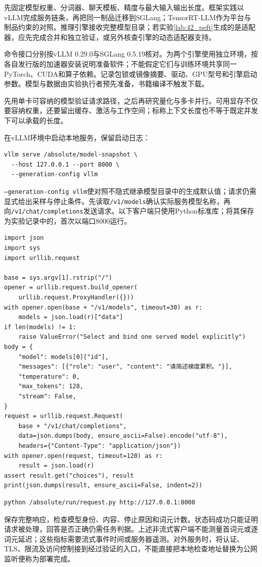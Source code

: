 先固定模型权重、分词器、聊天模板、精度与最大输入输出长度。框架实践以vLLM完成服务链条，再把同一制品迁移到SGLang；TensorRT-LLM作为平台与制品约束的对照\cite{vllm2026framework,sglang2026framework,nvidia2026tensorrtframework}。推理引擎接收完整模型目录；若实验\ref{lab:42_peft}生成的是适配器，应先完成合并和独立验证，或另外核查引擎的动态适配器支持。

命令接口分别按vLLM 0.29.0与SGLang 0.5.19核对。为两个引擎使用独立环境，按各自发行版的加速器安装说明准备软件；不能假定它们与训练环境共享同一PyTorch、CUDA和算子依赖。记录包锁或镜像摘要、驱动、GPU型号和引擎启动参数。模型与数据由实验执行者预先准备，书籍编译不触发下载。

先用单卡可容纳的模型验证请求路径，之后再研究量化与多卡并行。可用显存不仅要容纳权重，还要留出缓存、激活与工作空间；标称上下文长度也不等于既定并发下可以承载的长度。

在vLLM环境中启动本地服务，保留启动日志：
\begin{verbatim}
vllm serve /absolute/model-snapshot \
  --host 127.0.0.1 --port 8000 \
  --generation-config vllm
\end{verbatim}
\texttt{--generation-config vllm}使对照不隐式继承模型目录中的生成默认值；请求仍需显式给出采样与停止条件\cite{vllm2026framework}。先读取\texttt{/v1/models}确认实际服务模型名称，再向\texttt{/v1/chat/completions}发送请求。以下客户端只使用Python标准库；将其保存为实验记录中的，首次以端口8000运行。
\begin{verbatim}
import json
import sys
import urllib.request

base = sys.argv[1].rstrip("/")
opener = urllib.request.build_opener(
    urllib.request.ProxyHandler({}))
with opener.open(base + "/v1/models", timeout=30) as r:
    models = json.load(r)["data"]
if len(models) != 1:
    raise ValueError("Select and bind one served model explicitly")
body = {
    "model": models[0]["id"],
    "messages": [{"role": "user", "content": "请简述梯度累积。"}],
    "temperature": 0,
    "max_tokens": 128,
    "stream": False,
}
request = urllib.request.Request(
    base + "/v1/chat/completions",
    data=json.dumps(body, ensure_ascii=False).encode("utf-8"),
    headers={"Content-Type": "application/json"})
with opener.open(request, timeout=120) as r:
    result = json.load(r)
assert result.get("choices"), result
print(json.dumps(result, ensure_ascii=False, indent=2))
\end{verbatim}
\begin{verbatim}
python /absolute/run/request.py http://127.0.0.1:8000
\end{verbatim}
保存完整响应，检查模型身份、内容、停止原因和词元计数。状态码成功只能证明请求被处理，回答是否正确仍需任务判据。上述非流式客户端不能测量首词元或逐词元延迟；这些指标需要流式事件时间或服务器遥测。对外服务时，将认证、TLS、限流及访问控制接到经过验证的入口，不能直接把本地检查地址替换为公网监听便称为部署完成。

